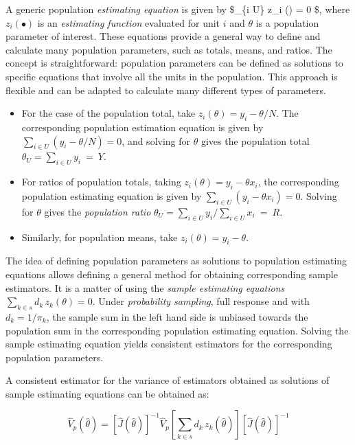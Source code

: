 \documentclass[
  12pt,
]{book}
\begin{document}
A generic population \emph{estimating equation} is given by \$\sum\_\{i \in U\} z\_i (\theta) = 0 \$, where \(z_i(\bullet)\) is an \emph{estimating function} evaluated for unit \(i\) and \(\theta\) is a population parameter of interest. These equations provide a general way to define and calculate many population parameters, such as totals, means, and ratios. The concept is straightforward: population parameters can be defined as solutions to specific equations that involve all the units in the population. This approach is flexible and can be adapted to calculate many different types of parameters.

\begin{itemize}
\item
  For the case of the population total, take \(z_i(\theta) = y_i - \theta / N\). The corresponding population estimation equation is given by \(\sum _{i \in U} (y_i - \theta / N) = 0\), and solving for \(\theta\) gives the population total \(\theta_U = \sum _{i \in U} y_i \ = \ Y\).
\item
  For ratios of population totals, taking \(z_i(\theta) = y_i - \theta x_i\), the corresponding population estimating equation is given by \(\sum _{i \in U} (y_i - \theta x_i) = 0\). Solving for \(\theta\) gives the \emph{population ratio} \(\theta_U = \sum _{i \in U} y_i / \sum _{i \in U} x_i \ = \ R\).
\item
  Similarly, for population means, take \(z_i(\theta) = y_i - \theta\).
\end{itemize}

The idea of defining population parameters as solutions to population estimating equations allows defining a general method for obtaining corresponding sample estimators. It is a matter of using the \emph{sample estimating equations} \(\sum _{k \in s} d_k \, z_k (\theta) = 0\). Under \emph{probability sampling}, full response and with \(d_k = 1 / \pi_k\), the sample sum in the left hand side is unbiased towards the population sum in the corresponding population estimating equation. Solving the sample estimating equation yields consistent estimators for the corresponding population parameters.

A consistent estimator for the variance of estimators obtained as solutions of sample estimating equations can be obtained as:

\[
\widehat V_p (\widehat \theta) = \left[ \widehat J ( \widehat \theta) \right] ^{-1} \widehat V_p \left[ \sum _{k \in s} d_k \, z_k (\widehat \theta)\right] \left[ \widehat J ( \widehat \theta) \right] ^{-1}
\]
\end{document}
